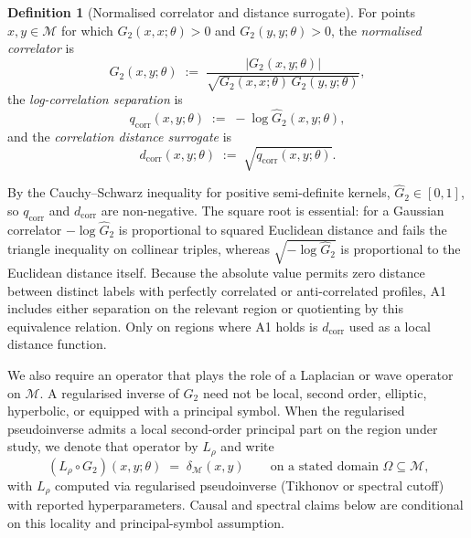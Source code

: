﻿\documentclass[12pt,a4paper]{article}
\theoremstyle{definition}
\newtheorem{definition}[theorem]{Definition}
\begin{document}
\begin{definition}[Normalised correlator and distance surrogate]
For points $x,y \in \mathcal{M}$ for which $G_2(x,x;\theta) > 0$ and $G_2(y,y;\theta) > 0$, the \emph{normalised correlator} is
\begin{equation}
\widehat{G}_2(x,y;\theta) \;:=\; \frac{|G_2(x,y;\theta)|}{\sqrt{G_2(x,x;\theta) \, G_2(y,y;\theta)}},
\end{equation}
the \emph{log-correlation separation} is
\begin{equation}
q_{\mathrm{corr}}(x,y;\theta) \;:=\; -\log \widehat{G}_2(x,y;\theta),
\end{equation}
and the \emph{correlation distance surrogate} is
\begin{equation}
d_{\mathrm{corr}}(x,y;\theta) \;:=\; \sqrt{q_{\mathrm{corr}}(x,y;\theta)}.
\end{equation}
\end{definition}

By the Cauchy--Schwarz inequality for positive semi-definite kernels, $\widehat{G}_2 \in [0,1]$, so $q_{\mathrm{corr}}$ and $d_{\mathrm{corr}}$ are non-negative. The square root is essential: for a Gaussian correlator $-\log\widehat{G}_2$ is proportional to squared Euclidean distance and fails the triangle inequality on collinear triples, whereas $\sqrt{-\log\widehat{G}_2}$ is proportional to the Euclidean distance itself. Because the absolute value permits zero distance between distinct labels with perfectly correlated or anti-correlated profiles, A1 includes either separation on the relevant region or quotienting by this equivalence relation. Only on regions where A1 holds is $d_{\mathrm{corr}}$ used as a local distance function.

We also require an operator that plays the role of a Laplacian or wave operator on $\mathcal{M}$. A regularised inverse of $G_2$ need not be local, second order, elliptic, hyperbolic, or equipped with a principal symbol. When the regularised pseudoinverse admits a local second-order principal part on the region under study, we denote that operator by $L_\rho$ and write
\begin{equation}
\label{eq:Lrho}
\left( L_\rho \circ G_2 \right)(x,y;\theta) \;=\; \delta_{\mathcal{M}}(x,y) \qquad \text{on a stated domain $\Omega \subseteq \mathcal{M}$,}
\end{equation}
with $L_\rho$ computed via regularised pseudoinverse (Tikhonov or spectral cutoff) with reported hyperparameters. Causal and spectral claims below are conditional on this locality and principal-symbol assumption.
\end{document}
